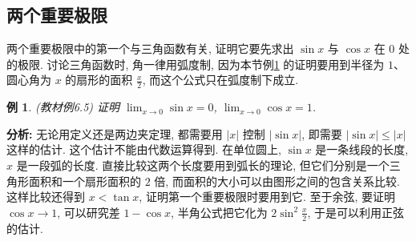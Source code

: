 \documentclass[UTF8,openany]{ctexbook}
\theoremstyle{chinesetextbook}
\newtheorem{example}{例}[section]
\begin{document}
\subsection{两个重要极限}
两个重要极限中的第一个与三角函数有关, 证明它要先求出 $\sin x$ 与 $\cos x$ 在 $0$ 处的极限. 讨论三角函数时, 角一律用弧度制, 因为本节例\ref{ex:6-5} 的证明要用到半径为 $1$、圆心角为 $x$ 的扇形的面积 $\displaystyle\frac x2$, 而这个公式只在弧度制下成立.
\begin{example}\label{ex:6-5}
\textnormal{(教材例6.5)} 证明 $\displaystyle\lim_{x\to0}\sin x=0$, $\displaystyle\lim_{x\to0}\cos x=1$.
\end{example}
\par\indent\textbf{分析:} 无论用定义还是两边夹定理, 都需要用 $|x|$ 控制 $|\sin x|$, 即需要 $|\sin x|\le|x|$ 这样的估计. 这个估计不能由代数运算得到. 在单位圆上, $\sin x$ 是一条线段的长度, $x$ 是一段弧的长度. 直接比较这两个长度要用到弧长的理论, 但它们分别是一个三角形面积和一个扇形面积的 $2$ 倍, 而面积的大小可以由图形之间的包含关系比较. 这样比较还得到 $x<\tan x$, 证明第一个重要极限时要用到它. 至于余弦, 要证明 $\cos x\to1$, 可以研究差 $1-\cos x$, 半角公式把它化为 $\displaystyle2\sin^2\frac x2$, 于是可以利用正弦的估计.
\end{document}
